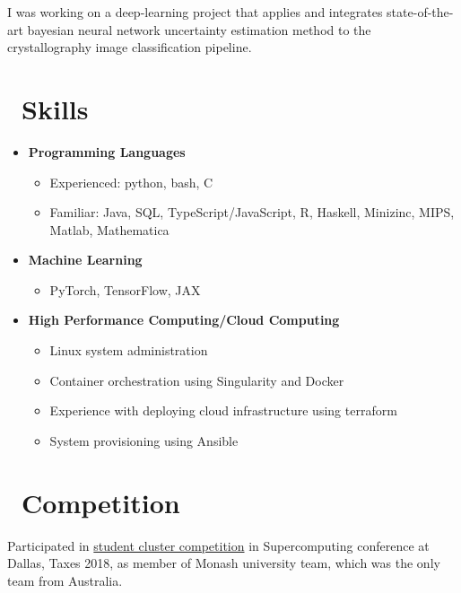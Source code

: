 \documentclass{resume}
\begin{document}

I was working on a deep-learning project that applies and integrates state-of-the-art bayesian neural network uncertainty estimation method to
the crystallography image classification pipeline.

\section{\faCogs\ Skills}
\begin{itemize}[parsep=0.5ex]


  \item \textbf{Programming Languages}
  \begin{itemize}
      \item Experienced: python, bash, C
      \item Familiar: Java, SQL, TypeScript/JavaScript, R, Haskell, Minizinc, MIPS, Matlab, Mathematica
  \end{itemize}
  \item \textbf{Machine Learning}
  \begin{itemize}
    \item PyTorch, TensorFlow, JAX
  \end{itemize}
  \item \textbf{High Performance Computing/Cloud Computing}
  \begin{itemize}
    \item Linux system administration
    \item Container orchestration using Singularity and Docker
    \item Experience with deploying cloud infrastructure using terraform
    \item System provisioning using Ansible
  \end{itemize}

\end{itemize}

\section{\faTrophy\ Competition}
Participated in \href{https://www.studentclustercompetition.us/}{student cluster competition} in Supercomputing conference at Dallas, Taxes 2018, as member of
Monash university team, which was the only team from Australia.
\end{document}
